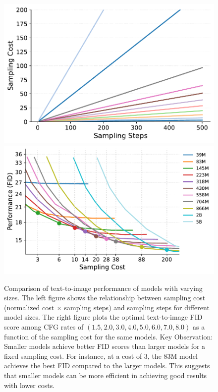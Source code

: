 \begin{figure}[!t]
    \centering 
    \def\xwidth{.3\linewidth}
    \includegraphics[height=\xwidth]{cp2/figures/analyze_inference_steps_costs.pdf}
    \includegraphics[height=\xwidth]{cp2/figures/analyze_inference_costs.pdf}
    \vspace{-.5\baselineskip}
    \caption{%
    Comparison of text-to-image performance of models with varying sizes. The left figure shows the relationship between sampling cost (normalized cost $\times$ sampling steps) and sampling steps for different model sizes. The right figure plots the optimal text-to-image FID score among CFG rates of $(1.5, 2.0, 3.0, 4.0, 5.0, 6.0, 7.0, 8.0)$ as a function of the sampling cost for the same models.
    Key Observation: Smaller models achieve better FID scores than larger models for a fixed sampling cost. For instance, at a cost of 3, the 83M model achieves the best FID compared to the larger models. This suggests that smaller models can be more efficient in achieving good results with lower costs.
    }
    \label{fig:optiamlrules}
\end{figure}


